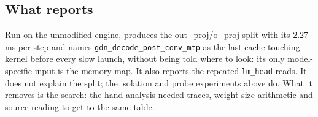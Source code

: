 \subsection{What \sys{} reports}

Run on the unmodified engine, \sys{} produces the out\_proj/o\_proj split with its 2.27\,ms per
step and names \texttt{gdn\_decode\_post\_conv\_mtp} as the last cache-touching kernel before every
slow launch, without being told where to look: its only model-specific input is the memory map. It also reports the repeated \texttt{lm\_head}
reads. It does not explain the split; the isolation and probe experiments above do. What it
removes is the search: the hand analysis needed traces, weight-size arithmetic and source
reading to get to the same table.
